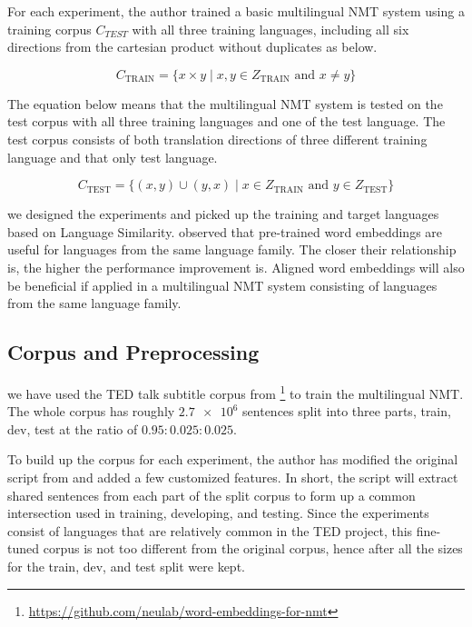 \documentclass[thesis,fonts=libertine]{cluu}
\begin{document}
For each experiment, the author trained a basic multilingual NMT system using a training corpus $C_{TEST}$ with all three training languages, including all six directions from the cartesian product without duplicates as below.

\begin{equation}
  C_{\text{TRAIN}} = \{x \times y \mid x, y \in Z_{\text{TRAIN}} \text{ and } x \neq y\}
\end{equation}

The equation below means that the multilingual NMT system is tested on the test corpus with all three training languages and one of the test language. The test corpus consists of both translation directions of three different training language and that only test language.

\begin{equation}
  C_{\text{TEST}} = \{(x, y)\cup(y,x) \mid x \in Z_{\text{TRAIN}} \text{ and } y \in Z_{\text{TEST}}\}
\end{equation}

we designed the experiments and picked up the training and target languages based on Language Similarity. \textcite{Qi:2018aa} observed that pre-trained word embeddings are useful for languages from the same language family. The closer their relationship is, the higher the performance improvement is. Aligned word embeddings will also be beneficial if applied in a multilingual NMT system consisting of languages from the same language family.

\subsection{Corpus and Preprocessing}

we have used the TED talk subtitle corpus from \textcite{Qi:2018aa} \footnote{\url{https://github.com/neulab/word-embeddings-for-nmt}} to train the multilingual NMT. The whole corpus has roughly $\num{2.7e6}$ sentences split into three parts, train, dev, test at the ratio of $0.95:0.025:0.025$.

To build up the corpus for each experiment, the author has modified the original script from \textcite{Qi:2018aa} and added a few customized features. In short, the script will extract shared sentences from each part of the split corpus to form up a common intersection used in training, developing, and testing. Since the experiments consist of languages that are relatively common in the TED project, this fine-tuned corpus is not too different from the original corpus, hence after all the sizes for the train, dev, and test split were kept.
\end{document}

